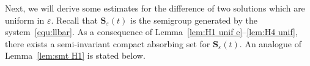 \documentclass[11pt, reqno]{amsart}
\theoremstyle{definition}
\numberwithin{equation}{section}
\newcommand{\bff}{\boldsymbol}
\newcommand{\bb}{\mathbb}
\newcommand{\ddt}{\frac{\mathrm{d}}{\mathrm{d}t}}
\newcommand{\norm}[2]{\left\|{#1}\right\|_{#2}}
\newcommand{\abs}[1]{\left|{#1}\right|}
\begin{document}

Next, we will derive some estimates for the difference of two solutions which are uniform in $\varepsilon$. Recall that $\bff{S}_\varepsilon(t)$ is the semigroup generated by the system~\eqref{equ:llbar}. As a consequence of Lemma~\ref{lem:H1 unif e}--\ref{lem:H4 unif}, there exists a semi-invariant compact absorbing set for $\bff{S}_\varepsilon(t)$. An analogue of Lemma~\ref{lem:smt H1} is stated below.
\end{document}

